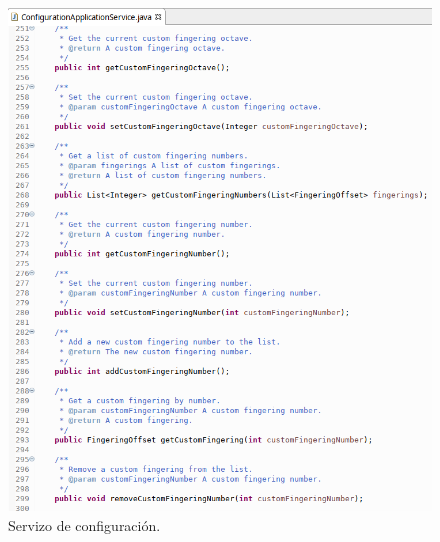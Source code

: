    \begin{figure}[htbp]
    \centering
    \includegraphics[scale=0.6, keepaspectratio=true]{./imagenes/servizo-configuracion-6.png}
    \caption{Servizo de configuración.}
    \label{figura:ServizoConfiguracion6}
   \end{figure}
   
